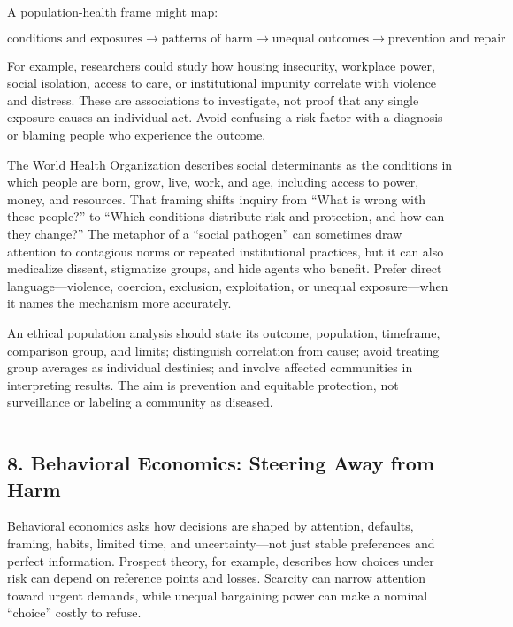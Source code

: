 \documentclass[
  11pt,
  letterpaper,
]{article}
\begin{document}
A population-health frame might map:

\[
\text{conditions and exposures}
\rightarrow \text{patterns of harm}
\rightarrow \text{unequal outcomes}
\rightarrow \text{prevention and repair}
\]

For example, researchers could study how housing insecurity, workplace
power, social isolation, access to care, or institutional impunity
correlate with violence and distress. These are associations to
investigate, not proof that any single exposure causes an individual
act. Avoid confusing a risk factor with a diagnosis or blaming people
who experience the outcome.

The World Health Organization describes social determinants as the
conditions in which people are born, grow, live, work, and age,
including access to power, money, and resources. That framing shifts
inquiry from ``What is wrong with these people?'' to ``Which conditions
distribute risk and protection, and how can they change?'' The metaphor
of a ``social pathogen'' can sometimes draw attention to contagious
norms or repeated institutional practices, but it can also medicalize
dissent, stigmatize groups, and hide agents who benefit. Prefer direct
language---violence, coercion, exclusion, exploitation, or unequal
exposure---when it names the mechanism more accurately.

An ethical population analysis should state its outcome, population,
timeframe, comparison group, and limits; distinguish correlation from
cause; avoid treating group averages as individual destinies; and
involve affected communities in interpreting results. The aim is
prevention and equitable protection, not surveillance or labeling a
community as diseased.

\begin{center}\rule{0.5\linewidth}{0.5pt}\end{center}

\subsection{8. Behavioral Economics: Steering Away from
Harm}\label{behavioral-economics-steering-away-from-harm}

Behavioral economics asks how decisions are shaped by attention,
defaults, framing, habits, limited time, and uncertainty---not just
stable preferences and perfect information. Prospect theory, for
example, describes how choices under risk can depend on reference points
and losses. Scarcity can narrow attention toward urgent demands, while
unequal bargaining power can make a nominal ``choice'' costly to refuse.
\end{document}
